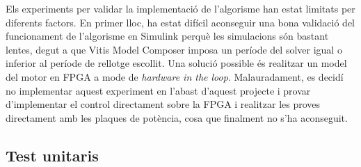Els experiments per validar la implementació de l'algorisme han estat limitats
per diferents factors. En primer lloc, ha estat difícil aconseguir una bona
validació del funcionament de l'algorisme en Simulink perquè les simulacions
són bastant lentes, degut a que Vitis Model Composer imposa un període
del solver igual o inferior al període de rellotge escollit. Una solució
possible és realitzar un model del motor en FPGA a mode de \emph{hardware in
the loop}. Malauradament, es decidí no implementar aquest experiment en l'abast
d'aquest projecte i provar d'implementar el control directament sobre la FPGA i
realitzar les proves directament amb les plaques de potència, cosa que
finalment no s'ha aconseguit.

\subsection { Test unitaris }
